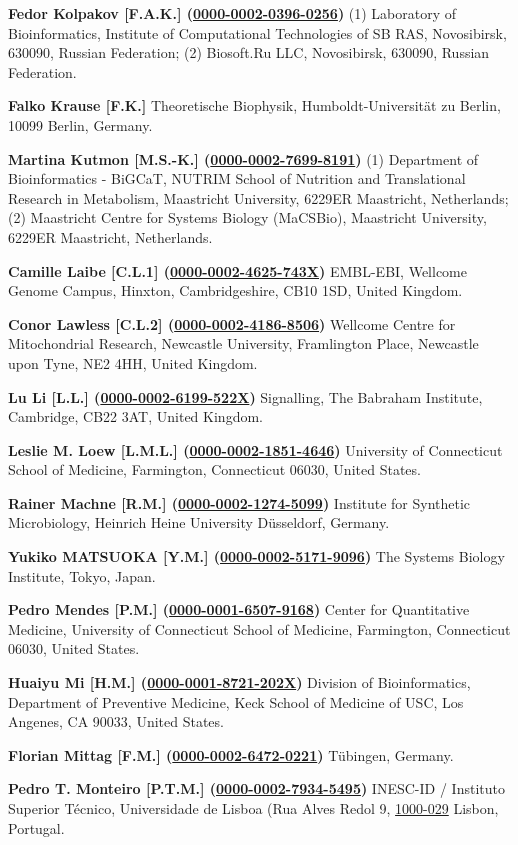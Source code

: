 \documentclass{sbml-paper}
\newcommand{\orcid}[1]{\href{https://orcid.org/#1}{#1}}
\begin{document}
\textbf{Fedor Kolpakov [F.A.K.] (\orcid{0000-0002-0396-0256})} (1) Laboratory of Bioinformatics, Institute of Computational Technologies of SB RAS, Novosibirsk, 630090, Russian Federation; (2) Biosoft.Ru LLC, Novosibirsk, 630090, Russian Federation.

\textbf{Falko Krause [F.K.]} Theoretische Biophysik, Humboldt-Universität zu Berlin, 10099 Berlin, Germany.

\textbf{Martina Kutmon [M.S.-K.] (\orcid{0000-0002-7699-8191})} (1) Department of Bioinformatics - BiGCaT, NUTRIM School of Nutrition and Translational Research in Metabolism, Maastricht University, 6229ER Maastricht, Netherlands; (2) Maastricht Centre for Systems Biology (MaCSBio), Maastricht University, 6229ER Maastricht, Netherlands.

\textbf{Camille Laibe [C.L.1] (\orcid{0000-0002-4625-743X})} EMBL-EBI, Wellcome Genome Campus, Hinxton, Cambridgeshire, CB10 1SD, United Kingdom.

\textbf{Conor Lawless [C.L.2] (\orcid{0000-0002-4186-8506})} Wellcome Centre for Mitochondrial Research, Newcastle University, Framlington Place, Newcastle upon Tyne, NE2 4HH, United Kingdom.

\textbf{Lu Li [L.L.] (\orcid{0000-0002-6199-522X})} Signalling, The Babraham Institute, Cambridge, CB22 3AT, United Kingdom.

\textbf{Leslie M. Loew [L.M.L.] (\orcid{0000-0002-1851-4646})} University of Connecticut School of Medicine, Farmington, Connecticut 06030, United States.

\textbf{Rainer Machne [R.M.] (\orcid{0000-0002-1274-5099})} Institute for Synthetic Microbiology, Heinrich Heine University Düsseldorf, Germany.

\textbf{Yukiko MATSUOKA [Y.M.] (\orcid{0000-0002-5171-9096})} The Systems Biology Institute, Tokyo, Japan.

\textbf{Pedro Mendes [P.M.] (\orcid{0000-0001-6507-9168})} Center for Quantitative Medicine, University of Connecticut School of Medicine, Farmington, Connecticut 06030, United States.

\textbf{Huaiyu Mi [H.M.] (\orcid{0000-0001-8721-202X})} Division of Bioinformatics, Department of Preventive Medicine, Keck School of Medicine of USC, Los Angenes, CA 90033, United States.

\textbf{Florian Mittag [F.M.] (\orcid{0000-0002-6472-0221})} Tübingen, Germany.

\textbf{Pedro T. Monteiro [P.T.M.] (\orcid{0000-0002-7934-5495})} INESC-ID / Instituto Superior Técnico, Universidade de Lisboa (Rua Alves Redol 9, \orcid{1000-029} Lisbon, Portugal.
\end{document}
